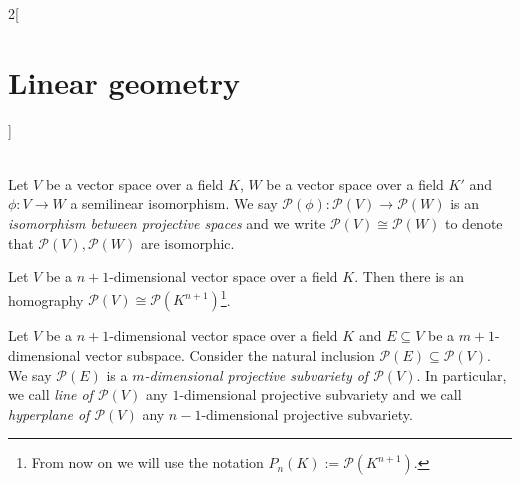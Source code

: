\documentclass[../../../main.tex]{subfiles}
\begin{document}
\begin{multicols}{2}[\section{Linear geometry}]
\begin{definition}
\begin{gather*}
        \end{gather*}
    \end{definition}
    \begin{definition}
        Let $V$ be a vector space over a field $K$, $W$ be a vector space over a field $K'$ and $\phi:V\rightarrow W$ a semilinear isomorphism. We say $\mathcal{P}(\phi):\mathcal{P}(V)\rightarrow\mathcal{P}(W)$ is an \textit{isomorphism between projective spaces} and we write $\mathcal{P}(V)\cong \mathcal{P}(W)$ to denote that $\mathcal{P}(V),\mathcal{P}(W)$ are isomorphic.
    \end{definition}
    \begin{prop}
        Let $V$ be a $n+1$-dimensional vector space over a field $K$. Then there is an homography $\mathcal{P}(V)\cong \mathcal{P}(K^{n+1})$\footnote{From now on we will use the notation $P_n(K):=\mathcal{P}(K^{n+1})$.}.
    \end{prop}
    \begin{definition}
        Let $V$ be a $n+1$-dimensional vector space over a field $K$ and $E\subseteq V$ be a $m+1$-dimensional vector subspace. Consider the natural inclusion $\mathcal{P}(E)\subseteq\mathcal{P}(V)$. We say $\mathcal{P}(E)$ is a \textit{$m$-dimensional projective subvariety of $\mathcal{P}(V)$}. In particular, we call \textit{line of $\mathcal{P}(V)$} any $1$-dimensional projective subvariety and we call \textit{hyperplane of $\mathcal{P}(V)$} any $n-1$-dimensional projective subvariety.
    \end{definition}

\end{multicols}
\end{document}
